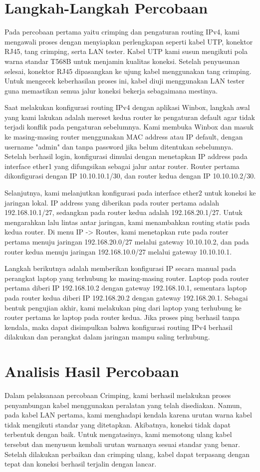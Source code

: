 \section{Langkah-Langkah Percobaan}
Pada percobaan pertama yaitu crimping dan pengaturan routing IPv4, kami mengawali proses dengan menyiapkan perlengkapan seperti kabel UTP, konektor RJ45, tang crimping, serta LAN tester. Kabel UTP kami susun mengikuti pola warna standar T568B untuk menjamin kualitas koneksi. Setelah penyusunan selesai, konektor RJ45 dipasangkan ke ujung kabel menggunakan tang crimping. 
Untuk mengecek keberhasilan proses ini, kabel diuji menggunakan LAN tester guna memastikan semua jalur koneksi bekerja sebagaimana mestinya. 

Saat melakukan konfigurasi routing IPv4 dengan aplikasi Winbox, langkah awal yang kami lakukan adalah mereset kedua router ke pengaturan default agar tidak terjadi konflik pada pengaturan sebelumnya. Kami membuka Winbox dan masuk ke masing-masing router menggunakan MAC address atau IP default, dengan username "admin" dan tanpa password jika belum ditentukan sebelumnya. Setelah berhasil login, konfigurasi dimulai dengan menetapkan IP address pada interface ether1 yang difungsikan sebagai jalur antar router. Router pertama dikonfigurasi dengan IP 10.10.10.1/30, dan router kedua dengan IP 10.10.10.2/30.

Selanjutnya, kami melanjutkan konfigurasi pada interface ether2 untuk koneksi ke jaringan lokal. IP address yang diberikan pada router pertama adalah 192.168.10.1/27, sedangkan pada router kedua adalah 192.168.20.1/27.
Untuk mengarahkan lalu lintas antar jaringan, kami menambahkan routing statis pada kedua router. Di menu IP -> Routes, kami menetapkan rute pada router pertama menuju jaringan 192.168.20.0/27 melalui gateway 10.10.10.2, dan pada router kedua menuju jaringan 192.168.10.0/27 melalui gateway 10.10.10.1.

Langkah berikutnya adalah memberikan konfigurasi IP secara manual pada perangkat laptop yang terhubung ke masing-masing router. Laptop pada router pertama diberi IP 192.168.10.2 dengan gateway 192.168.10.1, sementara laptop pada router kedua diberi IP 192.168.20.2 dengan gateway 192.168.20.1.
Sebagai bentuk pengujian akhir, kami melakukan ping dari laptop yang terhubung ke router pertama ke laptop pada router kedua. Jika proses ping berhasil tanpa kendala, maka dapat disimpulkan bahwa konfigurasi routing IPv4 berhasil dilakukan dan perangkat dalam jaringan mampu saling terhubung.

\section{Analisis Hasil Percobaan}
Dalam pelaksanaan percobaan Crimping, kami berhasil melakukan proses penyambungan kabel menggunakan peralatan yang telah disediakan. Namun, pada kabel LAN pertama, kami menghadapi kendala karena urutan warna kabel tidak mengikuti standar yang ditetapkan. Akibatnya, koneksi tidak dapat terbentuk dengan baik. Untuk mengatasinya, kami memotong ulang kabel tersebut dan menyusun kembali urutan warnanya sesuai standar yang benar. Setelah dilakukan perbaikan dan crimping ulang, kabel dapat terpasang dengan tepat dan koneksi berhasil terjalin dengan lancar.

